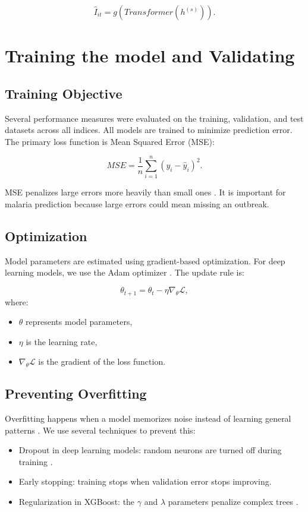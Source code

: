 	\[
	\hat{I}_{it} = g(Transformer(h^{(s)})).
	\]

	\section{Training the model and Validating}
	
	\subsection{Training Objective}
	
  Several performance measures were evaluated on the training, validation, and test datasets across all indices. All models are trained to minimize prediction error. The primary loss function is Mean Squared Error (MSE):
	
	\[
	MSE = \frac{1}{n} \sum_{i=1}^{n} (y_i - \hat{y}_i)^2.
	\]
	
	MSE penalizes large errors more heavily than small ones \cite{Hastie2009} . It is important for malaria prediction because large errors could mean missing an outbreak.
	
	\subsection{Optimization}
	
	Model parameters are estimated using gradient-based optimization. For deep learning models, we use the Adam optimizer \cite{Goodfellow-et-al-2016} . The update rule is:
	
	\[
	\theta_{t+1} = \theta_t - \eta \nabla_{\theta} \mathcal{L},
	\]
	where:
	\begin{itemize}
		\item $\theta$ represents model parameters,
		\item $\eta$ is the learning rate,
		\item $\nabla_{\theta} \mathcal{L}$ is the gradient of the loss function.
	\end{itemize}

	 
	\subsection{Preventing Overfitting}
	
	Overfitting happens when a model memorizes noise instead of learning general patterns \cite{Hastie2009}. We use several techniques to prevent this:
	
	\begin{itemize}
		\item Dropout in deep learning models: random neurons are turned off during training \cite{Goodfellow-et-al-2016}.
		\item Early stopping: training stops when validation error stops improving.
		\item Regularization in XGBoost: the \(\gamma\) and \(\lambda\) parameters penalize complex trees \cite{Syafei2023}.
	\end{itemize}
	
